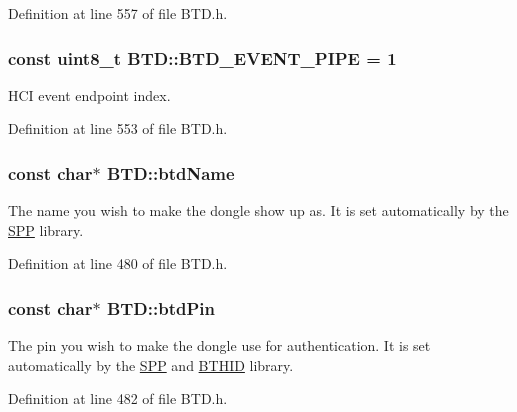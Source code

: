 \-Definition at line 557 of file \-B\-T\-D.\-h.

\hypertarget{class_b_t_d_a24166c9b308925eeb2f635fae43ca5ec}{
\subsubsection[{\-B\-T\-D\-\_\-\-E\-V\-E\-N\-T\-\_\-\-P\-I\-P\-E}]{\setlength{\rightskip}{0pt plus 5cm}const uint8\-\_\-t {\bf \-B\-T\-D\-::\-B\-T\-D\-\_\-\-E\-V\-E\-N\-T\-\_\-\-P\-I\-P\-E} = 1}}\label{class_b_t_d_a24166c9b308925eeb2f635fae43ca5ec}
\-H\-C\-I event endpoint index. 

\-Definition at line 553 of file \-B\-T\-D.\-h.

\hypertarget{class_b_t_d_a0359c0c158c864c27319810cbd1534f9}{
\subsubsection[{btd\-Name}]{\setlength{\rightskip}{0pt plus 5cm}const char$\ast$ {\bf \-B\-T\-D\-::btd\-Name}}}\label{class_b_t_d_a0359c0c158c864c27319810cbd1534f9}
\-The name you wish to make the dongle show up as. \-It is set automatically by the \hyperlink{class_s_p_p}{\-S\-P\-P} library. 

\-Definition at line 480 of file \-B\-T\-D.\-h.

\hypertarget{class_b_t_d_a215cb939c01ed3ff56db37841224546c}{
\subsubsection[{btd\-Pin}]{\setlength{\rightskip}{0pt plus 5cm}const char$\ast$ {\bf \-B\-T\-D\-::btd\-Pin}}}\label{class_b_t_d_a215cb939c01ed3ff56db37841224546c}
\-The pin you wish to make the dongle use for authentication. \-It is set automatically by the \hyperlink{class_s_p_p}{\-S\-P\-P} and \hyperlink{class_b_t_h_i_d}{\-B\-T\-H\-I\-D} library. 

\-Definition at line 482 of file \-B\-T\-D.\-h.

